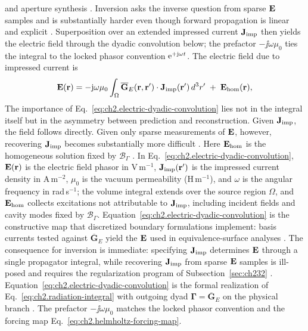 and aperture synthesis \cite{harrington2001}. Inversion asks the inverse
question from sparse $\mathbf{E}$ samples and is substantially harder even though forward
propagation is linear and explicit \cite{hansen1988}.
Superposition over an extended impressed current \(\mathbf{J}_{\mathrm{imp}}\) then yields the electric field
through the dyadic convolution below; the prefactor \(-\jj\omega\mu_0\) ties the integral
to the locked phasor convention \(\mathrm{e}^{+\mathrm{j}\omega t}\).
The electric field due to impressed current is
\begin{equation}
\label{eq:ch2.electric-dyadic-convolution}
\mathbf{E}(\mathbf{r})
=
-\mathrm{j}\omega\mu_0
\int_{\Omega}
\overline{\mathbf{G}}_{E}(\mathbf{r},\mathbf{r}')\cdot\mathbf{J}_{\mathrm{imp}}(\mathbf{r}')\,d^{3}r'
\;+\;\mathbf{E}_{\mathrm{hom}}(\mathbf{r}),
\end{equation}
The importance of Eq.~\eqref{eq:ch2.electric-dyadic-convolution} lies not in the integral
itself but in the asymmetry between prediction and reconstruction. Given $\mathbf{J}_{\mathrm{imp}}$, the field
follows directly. Given only sparse measurements of $\mathbf{E}$, however, recovering $\mathbf{J}_{\mathrm{imp}}$
becomes substantially more difficult \cite{hansen1988}. Here
\(\mathbf{E}_{\mathrm{hom}}\) is the homogeneous solution fixed by \(\mathcal{B}_\Gamma\)
\cite{stratton1941}.
In Eq.~\eqref{eq:ch2.electric-dyadic-convolution}, \(\mathbf{E}(\mathbf{r})\) is the electric
field phasor in V\,m\(^{-1}\), \(\mathbf{J}_{\mathrm{imp}}(\mathbf{r}')\) is the impressed current density in
A\,m\(^{-2}\), \(\mu_0\) is the vacuum permeability (H\,m\(^{-1}\)), and \(\omega\) is the
angular frequency in rad\,s\(^{-1}\); the volume integral extends over the source region
\(\Omega\), and \(\mathbf{E}_{\mathrm{hom}}\) collects excitations not attributable to \(\mathbf{J}_{\mathrm{imp}}\),
including incident fields and cavity modes fixed by \(\mathcal{B}_\Gamma\).
Equation~\eqref{eq:ch2.electric-dyadic-convolution} is the constructive map that
discretized boundary formulations implement: basis currents tested against
$\overline{\mathbf{G}}_{E}$ yield the $\mathbf{E}$ used in equivalence-surface analyses
\cite{harrington2001}. The consequence for inversion is
immediate: specifying $\mathbf{J}_{\mathrm{imp}}$ determines $\mathbf{E}$ through a single propagator integral, while
recovering $\mathbf{J}_{\mathrm{imp}}$ from sparse $\mathbf{E}$ samples is ill-posed and requires the regularization
program of Subsection~\ref{sec:ch232} \cite{stratton1941}. Equation~\eqref{eq:ch2.electric-dyadic-convolution} is the
formal realization of Eq.~\eqref{eq:ch2.radiation-integral} with outgoing dyad
\(\boldsymbol{\Gamma}=\overline{\mathbf{G}}_{E}\) on the physical branch
\cite{harrington2001}. The prefactor \(-\jj\omega\mu_0\) matches the locked phasor
convention and the forcing map Eq.~\eqref{eq:ch2.helmholtz-forcing-map}.
